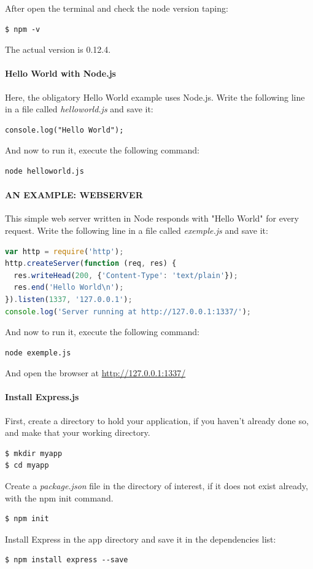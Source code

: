 After open the terminal and check the node version taping: 
\begin{lstlisting}
$ npm -v
\end{lstlisting}
The actual version is 0.12.4.
\paragraph*{Hello World with Node.js}
\hfill \break
Here, the obligatory Hello World example uses Node.js. Write the following line in a
file called \textit{helloworld.js} and save it:
\begin{lstlisting}
console.log("Hello World");
\end{lstlisting}
And now to run it, execute the following command:
\begin{lstlisting}
node helloworld.js
\end{lstlisting}
\paragraph*{AN EXAMPLE: WEBSERVER}
\hfill \break
This simple web server written in Node responds with "Hello World" for every request.
Write the following line in a
file called \textit{exemple.js} and save it:
\begin{lstlisting}[language=JavaScript]
var http = require('http');
http.createServer(function (req, res) {
  res.writeHead(200, {'Content-Type': 'text/plain'});
  res.end('Hello World\n');
}).listen(1337, '127.0.0.1');
console.log('Server running at http://127.0.0.1:1337/');
\end{lstlisting}
And now to run it, execute the following command:
\begin{lstlisting}
node exemple.js
\end{lstlisting}
And open the browser at \url{http://127.0.0.1:1337/}

\paragraph*{Install Express.js}
\hfill \break
First, create a directory to hold your application, if you haven’t already done so, and make that your working directory.
\begin{lstlisting}
$ mkdir myapp
$ cd myapp
\end{lstlisting}
Create a \textit{package.json} file in the directory of interest, if it does not exist already, with the npm init command.
\begin{lstlisting}
$ npm init
\end{lstlisting}
Install Express in the app directory and save it in the dependencies list:
\begin{lstlisting}
$ npm install express --save
\end{lstlisting}
